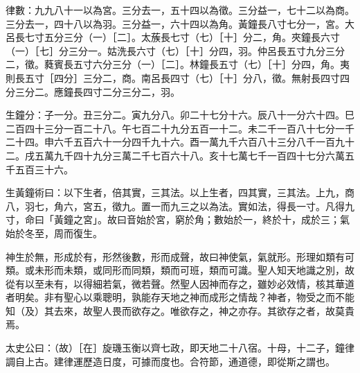 \begin{pinyinscope}
律數：九九八十一以為宮。三分去一，五十四以為徵。三分益一，七十二以為商。三分去一，四十八以為羽。三分益一，六十四以為角。黃鐘長八寸七分一，宮。大呂長七寸五分三分（一）［二］。太蔟長七寸（七）［十］分二，角。夾鐘長六寸（一）［七］分三分一。姑洗長六寸（七）［十］分四，羽。仲呂長五寸九分三分二，徵。蕤賓長五寸六分三分（一）［二］。林鐘長五寸（七）［十］分四，角。夷則長五寸［四分］三分二，商。南呂長四寸（七）［十］分八，徵。無射長四寸四分三分二。應鐘長四寸二分三分二，羽。

生鐘分：子一分。丑三分二。寅九分八。卯二十七分十六。辰八十一分六十四。巳二百四十三分一百二十八。午七百二十九分五百一十二。未二千一百八十七分一千二十四。申六千五百六十一分四千九十六。酉一萬九千六百八十三分八千一百九十二。戌五萬九千四十九分三萬二千七百六十八。亥十七萬七千一百四十七分六萬五千五百三十六。

生黃鐘術曰：以下生者，倍其實，三其法。以上生者，四其實，三其法。上九，商八，羽七，角六，宮五，徵九。置一而九三之以為法。實如法，得長一寸。凡得九寸，命曰「黃鐘之宮」。故曰音始於宮，窮於角；數始於一，終於十，成於三；氣始於冬至，周而復生。

神生於無，形成於有，形然後數，形而成聲，故曰神使氣，氣就形。形理如類有可類。或未形而未類，或同形而同類，類而可班，類而可識。聖人知天地識之別，故從有以至未有，以得細若氣，微若聲。然聖人因神而存之，雖妙必效情，核其華道者明矣。非有聖心以乘聰明，孰能存天地之神而成形之情哉？神者，物受之而不能知（及）其去來，故聖人畏而欲存之。唯欲存之，神之亦存。其欲存之者，故莫貴焉。

太史公曰：（故）［在］旋璣玉衡以齊七政，即天地二十八宿。十母，十二子，鐘律調自上古。建律運歷造日度，可據而度也。合符節，通道德，即從斯之謂也。


\end{pinyinscope}
